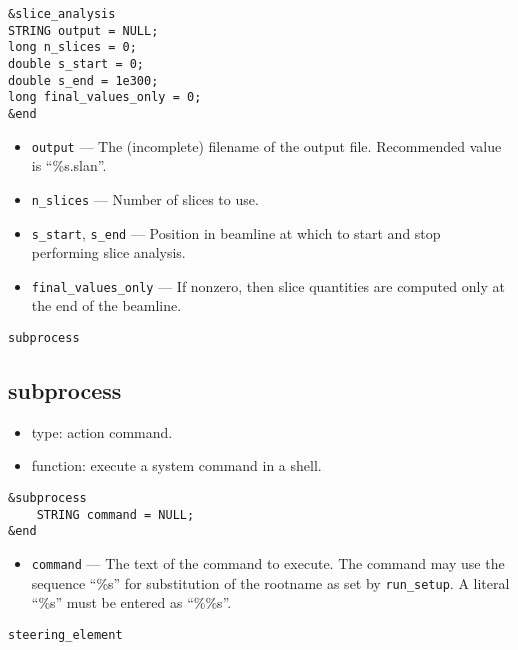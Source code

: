 \documentclass[11pt]{article}
\begin{document}
\begin{verbatim}
&slice_analysis
STRING output = NULL;
long n_slices = 0;
double s_start = 0;
double s_end = 1e300;
long final_values_only = 0;
&end
\end{verbatim}

\begin{itemize}
\item \verb|output| --- The (incomplete) filename of the output file.
	Recommended value is ``\%s.slan''.
\item \verb|n_slices| --- Number of slices to use.
\item \verb|s_start|, \verb|s_end| --- Position in beamline at which to start
        and stop performing slice analysis.
\item \verb|final_values_only| --- If nonzero, then slice quantities are computed
        only at the end of the beamline.
\end{itemize}

\newpage
\begin{center}{\Large\verb|subprocess|}\end{center}
\subsection{subprocess \label{subsec:subprocess}}

\begin{itemize}
\item type: action command.
\item function: execute a system command in a shell.
\end{itemize}

\begin{verbatim}
&subprocess 
    STRING command = NULL;
&end
\end{verbatim}

\begin{itemize}
\item \verb|command| --- The text of the command to execute.  The command may
use the sequence ``\%s'' for substitution of the rootname as set by \verb|run_setup|.
A literal ``\%s'' must be entered as ``\%\%s''.
\end{itemize}

\newpage
\begin{center}{\Large\verb|steering_element|}\end{center}
\end{document}
